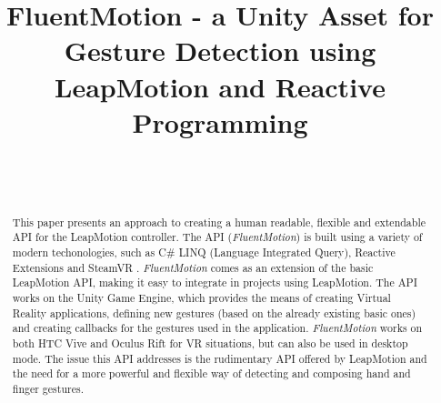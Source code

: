 \documentclass{sigchi}
\def\fluentmotion{\textit{FluentMotion}}
\def\rx{Reactive Extensions}
\def\unity{Unity Game Engine}
\def\leap{LeapMotion}
\def\vr{Virtual Reality}
\def\steamvr{SteamVR}
\def\vive{HTC Vive}
\def\oculus{Oculus Rift}
\begin{document}

\title{FluentMotion - a Unity Asset for Gesture Detection using LeapMotion and Reactive Programming}

\author{
  \\
  \\
}

\maketitle

\begin{abstract}
  This paper presents an approach to creating a human readable, flexible and extendable API for the \leap{} controller. The API (\fluentmotion{}) is built using a variety of modern techonologies, such as C\# LINQ (Language Integrated Query), \rx{} \cite{rx} and \steamvr{} \cite{SteamVR}. \fluentmotion{} comes as an extension of the basic \leap{} API, making it easy to integrate in projects using \leap{}. The API works on the \unity{}, which provides the means of creating \vr{} applications, defining new gestures (based on the already existing basic ones) and creating callbacks for the gestures used in the application. \fluentmotion{} works on both \vive{} and \oculus{} for VR situations, but can also be used in desktop mode. The issue this API addresses is the rudimentary API offered by \leap{} and the need for a more powerful and flexible way of detecting and composing hand and finger gestures.
\end{abstract}


\end{document}
